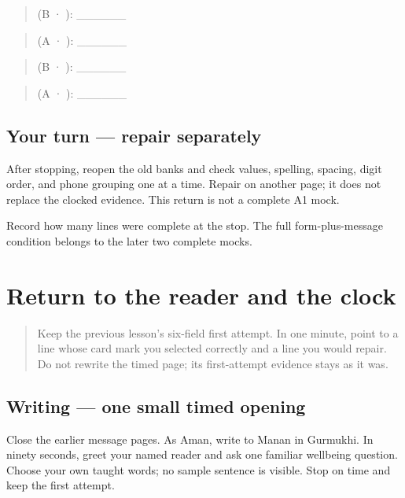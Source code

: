 \begin{quote}
 (B · ): \_\_\_\_\_\_
\end{quote}

\begin{quote}
 (A · ): \_\_\_\_\_\_
\end{quote}

\begin{quote}
 (B · ): \_\_\_\_\_\_
\end{quote}

\begin{quote}
 (A · ): \_\_\_\_\_\_
\end{quote}

\subsection*{Your turn — repair separately}
After stopping, reopen the old banks and check values, spelling, spacing, digit order, and phone grouping one at a time. Repair on another page; it does not replace the clocked evidence. This return is not a complete A1 mock.

\begin{tcolorbox}[breakable,colback=teal!4,colframe=teal!35!black,title={Before you move on}]
Record how many lines were complete at the stop. The full form-plus-message condition belongs to the later two complete mocks.
\end{tcolorbox}
\section[(named reader, short clock)]{Return to the reader and the clock}

\label{lesson:PA-W16-message-pacing-return}



\begin{quote}
Keep the previous lesson's six-field first attempt. In one minute, point to a line whose card mark you selected correctly and a line you would repair. Do not rewrite the timed page; its first-attempt evidence stays as it was.
\end{quote}

\subsection*{Writing — one small timed opening}
Close the earlier message pages. As Aman, write to Manan in Gurmukhi. In ninety seconds, greet your named reader and ask one familiar wellbeing question. Choose your own taught words; no sample sentence is visible. Stop on time and keep the first attempt.

